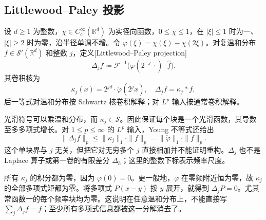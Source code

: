 \subsection{Littlewood--Paley 投影}
\label{b2:subsec:190302}

\begin{definition}\label{b2:def:19-dyadic-block}
设 \(d\geq1\) 为整数，\(\chi\in C_c^\infty(\mathbb R^d)\) 为实径向函数，\(0\leq\chi\leq1\)，在 \(|\xi|\leq1\) 时为一、\(|\xi|\geq2\) 时为零，沿半径单调不增。令 \(\varphi(\xi)=\chi(\xi)-\chi(2\xi)\)。对复温和分布 \(f\in\mathcal S'(\mathbb R^d)\) 和整数 \(j\)，定义[Littlewood--Paley projection]
\[
 \Delta_jf\coloneqq\mathcal F^{-1}
 \bigl(\varphi(2^{-j}\,\cdot)\cdot\widehat f\bigr).
\]
其卷积核为
\[
 \kappa_j(x)=2^{jd}\cdot\check\varphi(2^jx),
 \quad \Delta_jf=\kappa_j*f,
\]
后一等式对温和分布按 Schwartz 核卷积解释；对 \(L^p\) 输入按通常卷积解释。
\end{definition}

光滑符号可以乘温和分布，而 \(\kappa_j\in\mathcal S\)。因此保证每个块是一个光滑函数，其导数至多多项式增长。对 \(1\leq p\leq\infty\) 的 \(L^p\) 输入，Young 不等式还给出
\[
 \|\Delta_jf\|_p\leq\|\kappa_j\|_1\cdot\|f\|_p
 =\|\check\varphi\|_1\cdot\|f\|_p.
\]
这个单块界与 \(j\) 无关，但把它对无穷多个 \(j\) 直接相加并不能证明重构。\(\Delta_j\) 也不是 Laplace 算子或第一卷的有限差分 \(\Delta_h\)；这里的整数下标表示频率尺度。

\ProseParagraphBreak

所有 \(\kappa_j\) 的积分都为零，因为 \(\varphi(0)=0\)。更一般地，\(\varphi\) 在零频附近恒为零，故 \(\kappa_j\) 的全部多项式矩都为零。将多项式 \(P(x-y)\) 按 \(y\) 展开，就得到 \(\Delta_jP=0\)。尤其常函数一的每个频率块均为零。这说明在任意温和分布上，不能直接写 \(\sum_j\Delta_jf=f\)；至少所有多项式信息都被这一分解消去了。

